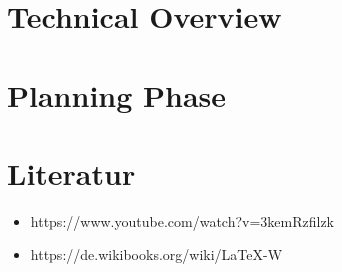\documentclass[11pt]{article}
\begin{document}
\section{Technical Overview}

\section{Planning Phase}






\newpage

\section{Literatur}

\begin{itemize}
	\item https://www.youtube.com/watch?v=3kemRzfilzk
	\item https://de.wikibooks.org/wiki/LaTeX-W
\end{itemize}
\end{document}
